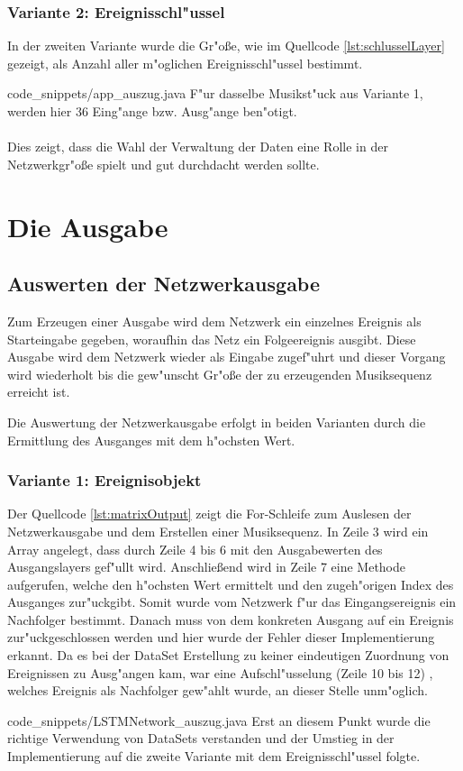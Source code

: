 {\subsubsection{Variante 2: Ereignisschl"ussel}
In der zweiten Variante wurde die Gr"o{\ss}e, wie im Quellcode \ref{lst:schlusselLayer} gezeigt, als Anzahl aller m"oglichen Ereignisschl"ussel bestimmt.

{code_snippets/app_auszug.java}
F"ur dasselbe Musikst"uck aus Variante 1, werden hier 36 Eing"ange bzw. Ausg"ange ben"otigt.\\
\\Dies zeigt, dass die Wahl der Verwaltung der Daten eine Rolle in der Netzwerkgr"o{\ss}e spielt und gut durchdacht werden sollte.


\section{Die Ausgabe}
\subsection{Auswerten der Netzwerkausgabe}
Zum Erzeugen einer Ausgabe wird dem Netzwerk ein einzelnes Ereignis als Starteingabe gegeben, woraufhin das Netz ein Folgeereignis ausgibt. Diese Ausgabe wird dem Netzwerk wieder als Eingabe zugef"uhrt und dieser Vorgang wird wiederholt bis die gew"unscht Gr"o{\ss}e der zu erzeugenden Musiksequenz erreicht ist.

Die Auswertung der Netzwerkausgabe erfolgt in beiden Varianten durch die Ermittlung des Ausganges mit dem h"ochsten Wert.

\subsubsection{Variante 1: Ereignisobjekt}
 Der Quellcode \ref{lst:matrixOutput} zeigt die For-Schleife zum Auslesen der Netzwerkausgabe und dem Erstellen einer Musiksequenz. In Zeile 3 wird ein Array angelegt, dass durch Zeile 4 bis 6 mit den Ausgabewerten des Ausgangslayers gef"ullt wird. Anschlie{\ss}end wird in Zeile 7 eine Methode aufgerufen, welche den h"ochsten Wert ermittelt und den zugeh"origen Index des Ausganges zur"uckgibt. Somit wurde vom Netzwerk f"ur das Eingangsereignis ein Nachfolger bestimmt. Danach muss von dem konkreten Ausgang auf ein Ereignis zur"uckgeschlossen werden und hier wurde der Fehler dieser Implementierung erkannt. Da es bei der DataSet Erstellung zu keiner eindeutigen Zuordnung von Ereignissen zu Ausg"angen kam, war eine Aufschl"usselung (Zeile 10 bis 12) , welches Ereignis als Nachfolger gew"ahlt wurde, an dieser Stelle unm"oglich.

{code_snippets/LSTMNetwork_auszug.java}
Erst an diesem Punkt wurde die richtige Verwendung von DataSets verstanden und der Umstieg in der Implementierung auf die zweite Variante mit dem Ereignisschl"ussel folgte.

}
